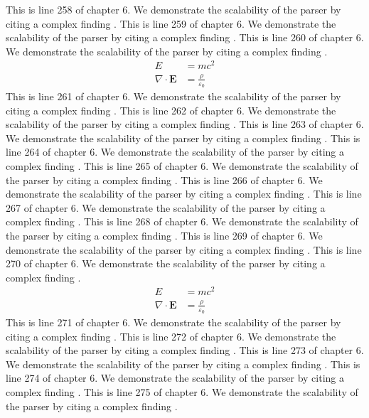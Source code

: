 This is line 258 of chapter 6. We demonstrate the scalability of the parser by citing a complex finding \cite{ref6_258}.
This is line 259 of chapter 6. We demonstrate the scalability of the parser by citing a complex finding \cite{ref6_259}.
This is line 260 of chapter 6. We demonstrate the scalability of the parser by citing a complex finding \cite{ref6_260}.
\begin{align*}
  E &= mc^2 \\
  \nabla \cdot \mathbf{E} &= \frac{\rho}{\varepsilon_0}
\end{align*}
This is line 261 of chapter 6. We demonstrate the scalability of the parser by citing a complex finding \cite{ref6_261}.
This is line 262 of chapter 6. We demonstrate the scalability of the parser by citing a complex finding \cite{ref6_262}.
This is line 263 of chapter 6. We demonstrate the scalability of the parser by citing a complex finding \cite{ref6_263}.
This is line 264 of chapter 6. We demonstrate the scalability of the parser by citing a complex finding \cite{ref6_264}.
This is line 265 of chapter 6. We demonstrate the scalability of the parser by citing a complex finding \cite{ref6_265}.
This is line 266 of chapter 6. We demonstrate the scalability of the parser by citing a complex finding \cite{ref6_266}.
This is line 267 of chapter 6. We demonstrate the scalability of the parser by citing a complex finding \cite{ref6_267}.
This is line 268 of chapter 6. We demonstrate the scalability of the parser by citing a complex finding \cite{ref6_268}.
This is line 269 of chapter 6. We demonstrate the scalability of the parser by citing a complex finding \cite{ref6_269}.
This is line 270 of chapter 6. We demonstrate the scalability of the parser by citing a complex finding \cite{ref6_270}.
\begin{align*}
  E &= mc^2 \\
  \nabla \cdot \mathbf{E} &= \frac{\rho}{\varepsilon_0}
\end{align*}
This is line 271 of chapter 6. We demonstrate the scalability of the parser by citing a complex finding \cite{ref6_271}.
This is line 272 of chapter 6. We demonstrate the scalability of the parser by citing a complex finding \cite{ref6_272}.
This is line 273 of chapter 6. We demonstrate the scalability of the parser by citing a complex finding \cite{ref6_273}.
This is line 274 of chapter 6. We demonstrate the scalability of the parser by citing a complex finding \cite{ref6_274}.
This is line 275 of chapter 6. We demonstrate the scalability of the parser by citing a complex finding \cite{ref6_275}.
